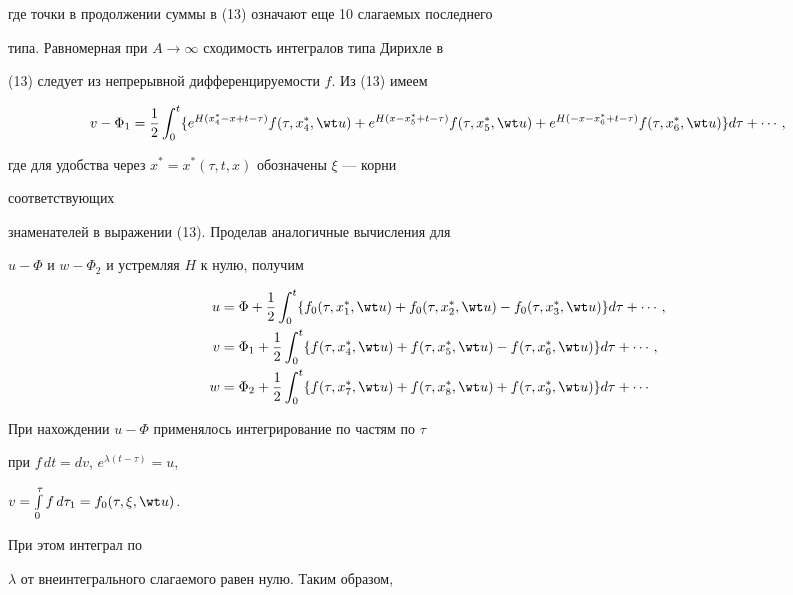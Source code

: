 где точки в продолжении суммы в (13) означают еще 10 слагаемых последнего 


типа. Равномерная при $A\to\infty$ сходимость интегралов типа Дирихле в 


(13) следует из непрерывной дифференцируемости $f$. Из (13) имеем 


\begin{equation} 


v-\Phi_1=\frac{1}{2}\int^t_0\{e^{H(x^*_4-x+t-\tau)} 


f(\tau,x^*_4,\wt u)+e^{H(x-x^*_5+t-\tau)}f(\tau,x^*_5,\wt u)+ 


e^{H(-x-x^*_6+t-\tau)}f(\tau,x^*_6,\wt u)\}d\tau+\dotsb, 


\end{equation} 


где для удобства через $x^*=x^*(\tau,t,x)$ обозначены $\xi$ --- корни 


соответствующих 


знаменателей в выражении (13). Проделав аналогичные вычисления для 


$u-\Phi$ и $w-\Phi_2$ и устремляя $H$ к нулю, получим 


\begin{align} 


u&=\Phi+\frac{1}{2}\int^t_0\{f_0(\tau,x^*_1,\wt u)+ 


f_0(\tau,x^*_2,\wt u)-f_0(\tau,x^*_3,\wt u)\}d\tau+\dotsb,\notag \\ 


% 


v&=\Phi_1+\frac{1}{2}\int^t_0\{f(\tau,x^*_4,\wt u)+ 


f(\tau,x^*_5,\wt u)-f(\tau,x^*_6,\wt u)\}d\tau+\dotsb, \\


% 


w&=\Phi_2+\frac{1}{2}\int^t_0\{f(\tau,x^*_7,\wt u)+ 


f(\tau,x^*_8,\wt u)+f(\tau,x^*_9,\wt u)\}d\tau+\dotsb\notag 


\end{align} 


При нахождении $u-\Phi$ применялось интегрирование по частям по $\tau$ 


при $f\,dt=dv$, $e^{\lambda(t-\tau)}=u$, 


$v=\intl^\tau_0 f\,d\tau_1=f_0(\tau,\xi,\wt u)$. 


При этом интеграл по 


$\lambda$ от внеинтегрального слагаемого равен нулю. Таким образом, 


